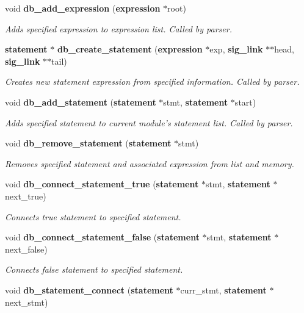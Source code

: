 \begin{CompactItemize}
void {\bf db\_\-add\_\-expression} ({\bf expression} $\ast$root)
\begin{CompactList}\small\item\em Adds specified expression to expression list. Called by parser. \item\end{CompactList}\item 
{\bf statement} $\ast$ {\bf db\_\-create\_\-statement} ({\bf expression} $\ast$exp, {\bf sig\_\-link} $\ast$$\ast$head, {\bf sig\_\-link} $\ast$$\ast$tail)
\begin{CompactList}\small\item\em Creates new statement expression from specified information. Called by parser. \item\end{CompactList}\item 
void {\bf db\_\-add\_\-statement} ({\bf statement} $\ast$stmt, {\bf statement} $\ast$start)
\begin{CompactList}\small\item\em Adds specified statement to current module's statement list. Called by parser. \item\end{CompactList}\item 
void {\bf db\_\-remove\_\-statement} ({\bf statement} $\ast$stmt)
\begin{CompactList}\small\item\em Removes specified statement and associated expression from list and memory. \item\end{CompactList}\item 
void {\bf db\_\-connect\_\-statement\_\-true} ({\bf statement} $\ast$stmt, {\bf statement} $\ast$next\_\-true)
\begin{CompactList}\small\item\em Connects true statement to specified statement. \item\end{CompactList}\item 
void {\bf db\_\-connect\_\-statement\_\-false} ({\bf statement} $\ast$stmt, {\bf statement} $\ast$next\_\-false)
\begin{CompactList}\small\item\em Connects false statement to specified statement. \item\end{CompactList}\item 
void {\bf db\_\-statement\_\-connect} ({\bf statement} $\ast$curr\_\-stmt, {\bf statement} $\ast$next\_\-stmt)

\end{CompactItemize}
